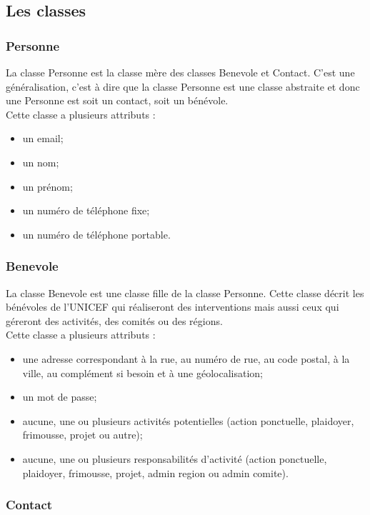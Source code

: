 \subsection{Les classes}

\subsubsection*{Personne}

La classe Personne est la classe mère des classes Benevole et Contact. C'est une généralisation, c'est à dire que la classe Personne est une classe abstraite et donc une Personne est soit un contact, soit un bénévole. \\
Cette classe a plusieurs attributs : 
\begin{itemize}
\item un email;
\item un nom;
\item un prénom;
\item un numéro de téléphone fixe;
\item un numéro de téléphone portable.
\end{itemize}

\subsubsection*{Benevole}

La classe Benevole est une classe fille de la classe Personne. Cette classe décrit les bénévoles de l'UNICEF qui réaliseront des interventions mais aussi ceux qui géreront des activités, des comités ou des régions.\\
Cette classe a plusieurs attributs : 
\begin{itemize}
\item une adresse correspondant à la rue, au numéro de rue, au code postal, à la ville, au complément si besoin et à une géolocalisation;
\item un mot de passe;
\item aucune, une ou plusieurs activités potentielles (action ponctuelle, plaidoyer, frimousse, projet ou autre);
\item aucune, une ou plusieurs responsabilités d'activité (action ponctuelle, plaidoyer, frimousse, projet, admin region ou admin comite). 
\end{itemize}


\subsubsection*{Contact}

